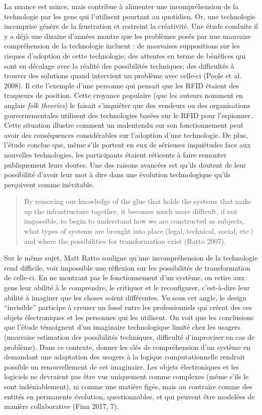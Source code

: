 \documentclass[]{article}
\begin{document}
La nuance est mince, mais contribue à alimenter une incompréhension de
la technologie par les gens qui l'utilisent pourtant au quotidien. Or,
une technologie incomprise génère de la frustration et restreint la
créativité. Une étude conduite il y a déjà une dizaine d'années montre
que les problèmes posés par une mauvaise compréhension de la technologie
incluent : de mauvaises suppositions sur les risques d'adoption de cette
technologie; des attentes en terme de bénéfices qui sont en décalage
avec la réalité des possibilités techniques; des difficultés à trouver
des solutions quand intervient un problème avec celle-ci (Poole et al.
2008). Il cite l'exemple d'une personne qui pensait que les RFID étaient
des traqueurs de position. Cette croyance populaire (que les auteurs
nomment en anglais \emph{folk theories}) le faisait s'inquiéter que des
vendeurs ou des organisations gouvernementales utilisent des
technologies basées sur le RFID pour l'espionner. Cette situation
illustre comment un malentendu sur son fonctionnement peut avoir des
conséquences considérables sur l'adoption d'une technologie. De plus,
l'étude conclue que, même s'ils portent en eux de sérieuses inquiétudes
face aux nouvelles technologies, les participants étaient réticents à
faire remonter publiquement leurs doutes. Une des raisons avancées est
qu'ils doutent de leur possibilité d'avoir leur mot à dire dans une
évolution technologique qu'ils perçoivent comme inévitable.

\begin{quote}
By removing our knowledge of the glue that holds the systems that make
up the infrastructure together, it becomes much more difficult, if not
impossible, to begin to understand how we are constructed as subjects,
what types of systems are brought into place (legal, technical, social,
etc.) and where the possibilities for transformation exist (Ratto 2007).
\end{quote}

Sur le même sujet, Matt Ratto souligne qu'une incompréhension de la
technologie rend difficile, voir impossible une réflexion sur les
possibilités de transformation de celle-ci. En ne montrant pas le
fonctionnement d'un système, on retire aux gens leur abilité à le
comprendre, le critiquer et le reconfigurer, c'est-à-dire leur abilité à
imaginer que les choses soient différentes. Vu sous cet angle, le design
``invisible'' participe à creuser un fossé entre les professionnels qui
créent des ces objets électroniques et les personnes qui les utilisent.
On voit que les conclusions que l'étude témoignent d'un imaginaire
technologique limité chez les usagers (mauvaise estimation des
possibilités techniques, difficulté d'improviser en cas de problème).
Dans ce contexte, donner les clés de compréhension d'un système en
demandant une adaptation des usagers à la logique computationnelle
rendrait possible un renouvellement de cet imaginaire. Les objets
électroniques et les logiciels ne devraient pas être vus uniquement
comme complexes (même s'ils le sont indéniablement), ni comme une
matière figée, mais au contraire comme des entités en permanente
évolution, questionnables, et qui peuvent être modelées de manière
collaborative (Finn 2017, 7).
\end{document}
